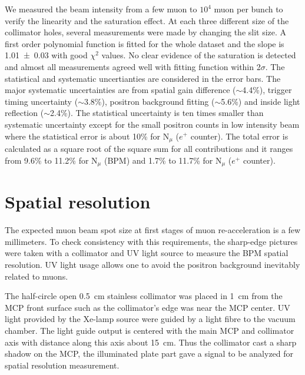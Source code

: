 \documentclass[preprint,3p,twocolumn]{elsarticle}
\begin{document}
We measured the beam intensity from a few muon to $10^{4}$ muon per bunch to verify the linearity and the saturation effect. At each three different size of the collimator holes, several measurements were made by changing the slit size.
A first order polynomial function is fitted for the whole dataset and the slope is \num{1.01\pm 0.03} with good $\chi^{2}$ values.
No clear evidence of the saturation is detected and almost all measurements agreed well with fitting function within 2$\sigma$. The statistical and systematic uncertianties are considered in the error bars. The major systematic uncertainties are from spatial gain difference ($\sim$4.4\%), trigger timing uncertainty ($\sim$3.8\%), positron background fitting ($\sim$5.6\%) and inside light reflection ($\sim$2.4\%). The statistical uncertainty is ten times smaller than systematic uncertainty except for the small positron counts in low intensity beam where the statistical error is about 10\% for N$_\mu$ ($e^+$ counter). The total error is calculated as a square root of the square sum for all contributions and it ranges from 9.6\% to 11.2\% for N$_\mu$ (BPM) and 1.7\% to 11.7\% for N$_\mu$ ($e^+$ counter).

 

\section{Spatial resolution}
 
The expected muon beam spot size at first stages of muon re-acceleration is a few millimeters.
To check consistency with this requirements, the sharp-edge pictures were taken with a collimator and UV light source to measure the BPM spatial resolution.
UV light usage allows one to avoid the positron background inevitably related to muons.

The half-circle open \SI{.5}{\cm} stainless collimator was placed in \SI{1}{\cm} from the MCP front surface
such as the collimator's edge was near the MCP center.
UV light provided by the Xe-lamp source were guided by a light fibre to the vacuum chamber.
The light guide output is centered with the main MCP and collimator axis
with distance along this axis about \SI{15}{\cm}.
Thus the collimator cast a sharp shadow on the MCP,
the illuminated plate part gave a signal to be analyzed for spatial resolution measurement.
\end{document}

